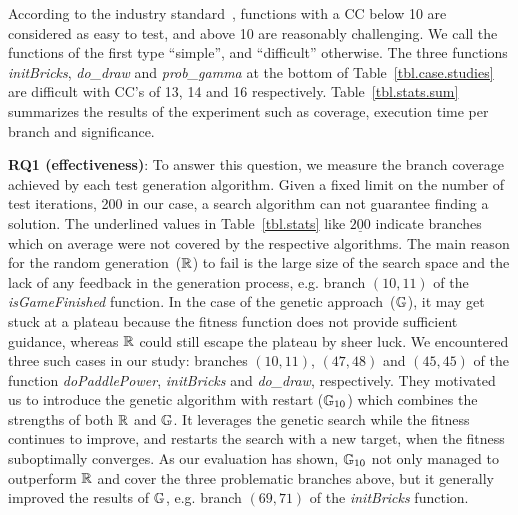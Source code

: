 According to the industry standard~\cite{bray1997c4}, functions with a CC below 10 are considered as easy to test, and above 10 are reasonably challenging. We call the functions of the first type ``simple'', and ``difficult'' otherwise. The three functions \mbox{\emph{initBricks}}, \emph{do_draw} and \emph{prob_gamma} at the bottom of Table~\ref{tbl.case.studies} are difficult with CC's of 13, 14 and 16 respectively. Table~\ref{tbl.stats.sum} summarizes the results of the experiment such as coverage, execution time per branch and significance.

\textbf{RQ1 (effectiveness)}: To answer this question, we measure the branch coverage achieved by each test generation algorithm. Given a fixed limit on the number of test iterations, 200 in our case, a search algorithm can not guarantee finding a solution. The underlined values in Table~\ref{tbl.stats} like $\underline{200}$ indicate branches which on average were not covered by the respective algorithms. The main reason for the random generation~($\mathbb{R}$) to fail is the large size of the search space and the lack of any feedback in the generation process, e.g. branch $(10,11)$ of the \emph{isGameFinished} function. In the case of the genetic approach~($\mathbb{G}$), it  may get stuck at a plateau because the fitness function does not provide sufficient guidance, whereas $\mathbb{R}$ could still escape the plateau by sheer luck. We encountered three such cases in our study: branches $(10,11)$, $(47,48)$ and $(45,45)$ of the function \emph{doPaddlePower}, \emph{initBricks} and \emph{do_draw}, respectively. They motivated us to introduce the genetic algorithm with restart ($\mathbb{G}_{10}$) which combines the strengths of both $\mathbb{R}$ and $\mathbb{G}$. It leverages the genetic search while the fitness continues to improve, and restarts the search with a new target, when the fitness suboptimally converges. As our evaluation has shown, $\mathbb{G}_{10}$ not only managed to outperform $\mathbb{R}$ and cover the three problematic branches above, but it generally improved the results of $\mathbb{G}$, e.g. branch $(69,71)$ of the \emph{initBricks} function.\\

